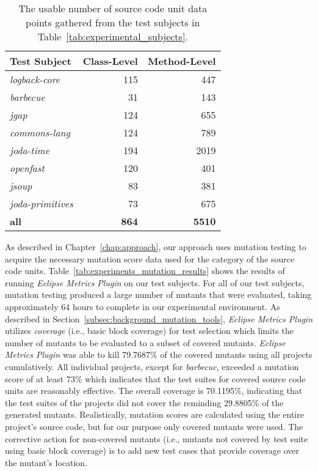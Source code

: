\begin{sidewaystable}[!tb]
  \centering
  \caption{The usable number of source code unit data points gathered from the test subjects in Table~\ref{tab:experimental_subjects}.}
  \label{tab:experiments_collected_data}
  \begin{threeparttable}
    \begin{tabular}{|l|r|r|}
      \rowcolor[RGB]{169,196,223}
      \hline \textbf{Test Subject} & \textbf{Class-Level} & \textbf{Method-Level} \\
      \hline \emph{logback-core} & 115 & 447 \\
      \hline \emph{barbecue} & 31 & 143 \\
      \hline \emph{jgap} & 124 & 655 \\
      \hline \emph{commons-lang} & 124 & 789 \\
      \hline \emph{joda-time} & 194 & 2019 \\
      \hline \emph{openfast} & 120 & 401 \\
      \hline \emph{jsoup} & 83 & 381 \\
      \hline \emph{joda-primitives} & 73 & 675 \\
      \hline \textbf{all} & \textbf{864} & \textbf{5510} \\
      \hline
    \end{tabular}
  \end{threeparttable}
\end{sidewaystable}
\afterpage\clearpage

\noindent
As described in Chapter~\ref{chap:approach}, our approach uses mutation testing to acquire the necessary mutation score data used for the category of the source code units. Table~\ref{tab:experiments_mutation_results} shows the results of running \emph{Eclipse Metrics Plugin} on our test subjects. For all of our test subjects, mutation testing produced a large number of mutants that were evaluated, taking approximately 64 hours to complete in our experimental environment. As described in Section~\ref{subsec:background_mutation_tools}, \emph{Eclipse Metrics Plugin} utilizes \emph{coverage} (i.e., basic block coverage) for test selection which limits the number of mutants to be evaluated to a subset of covered mutants. \emph{Eclipse Metrics Plugin} was able to kill 79.7687\% of the covered mutants using all projects cumulatively. All individual projects, except for \emph{barbecue}, exceeded a mutation score of at least 73\% which indicates that the test suites for covered source code units are reasonably effective. The overall coverage is 70.1195\%, indicating that the test suites of the projects did not cover the reminding 29.8805\% of the generated mutants. Realistically, mutation scores are calculated using the entire project's source code, but for our purpose only covered mutants were used. The corrective action for non-covered mutants (i.e., mutants not covered by test suite using basic block coverage) is to add new test cases that provide coverage over the mutant's location.

